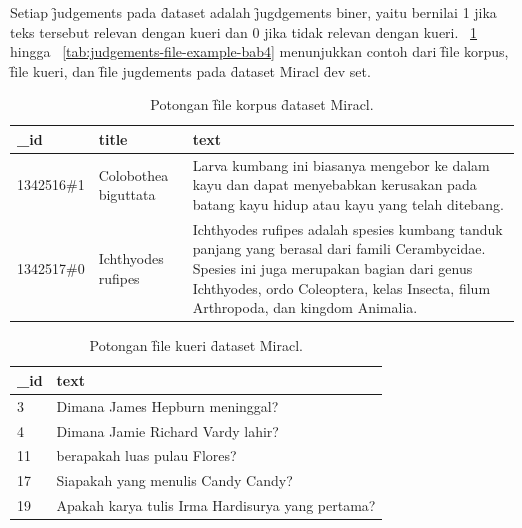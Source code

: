 Setiap \f{judgements} pada \f{dataset} adalah \f{jugdgements} biner, yaitu bernilai 1 jika teks tersebut relevan dengan kueri dan 0 jika tidak relevan dengan kueri. \tab~\ref{tab:contoh-file-korpus-bab4} hingga \tab~\ref{tab:judgements-file-example-bab4} menunjukkan contoh dari \f{file} korpus, \f{file} kueri, dan \f{file jugdements} pada \f{dataset} Miracl \f{dev set}.
\begin{table}
    \centering
    \caption{Potongan \f{file} korpus \f{dataset} Miracl.}
    \label{tab:contoh-file-korpus-bab4}
    \begin{tabular}{|l|l|p{}|}
        \hline
        \textbf{\_id}    & \textbf{title}             & \textbf{text}                                                                                                 \\ \hline
        1342516\#1  & Colobothea biguttata & Larva kumbang ini biasanya mengebor ke dalam kayu dan dapat menyebabkan kerusakan pada batang kayu hidup atau kayu yang telah ditebang. \\ \hline
        1342517\#0  & Ichthyodes rufipes  & Ichthyodes rufipes adalah spesies kumbang tanduk panjang yang berasal dari famili Cerambycidae. Spesies ini juga merupakan bagian dari genus Ichthyodes, ordo Coleoptera, kelas Insecta, filum Arthropoda, dan kingdom Animalia. \\ \hline
    \end{tabular}
\end{table}

\begin{table}
    \centering
    \caption{Potongan \f{file} kueri \f{dataset} Miracl.}
    \label{tab:query-file-example-bab4}
    \begin{tabular}{|l|p{}|}
        \hline
        \textbf{\_id} & \textbf{text}                                                                 \\ \hline
        3             & Dimana James Hepburn meninggal?                                              \\ \hline
        4             & Dimana Jamie Richard Vardy lahir?                                            \\ \hline
        11            & berapakah luas pulau Flores?                                                 \\ \hline
        17            & Siapakah yang menulis Candy Candy?                                           \\ \hline
        19            & Apakah karya tulis Irma Hardisurya yang pertama?                              \\ \hline
    \end{tabular}
\end{table}

